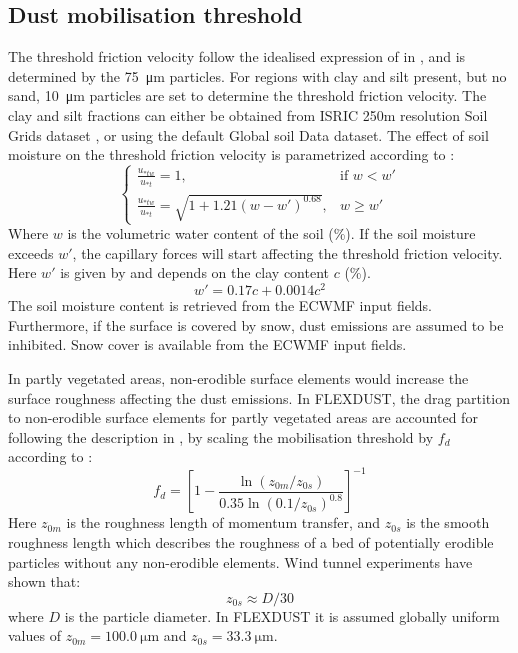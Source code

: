 \subsection{Dust mobilisation threshold}
The threshold friction velocity follow the idealised expression of \textcite{shao2000simple} in , and is determined by the \SI{75}{\micro\metre} particles. 
For regions with clay and silt present, but no sand, \SI{10}{\micro\metre} 
particles are set to determine the threshold friction velocity. The clay and 
silt fractions can either be obtained from ISRIC 250m resolution Soil Grids dataset 
\parencite{soil-grid_ref}, or using the default Global soil Data \cite{task2014global} dataset. 
The effect of soil moisture on the threshold friction velocity is parametrized according to \textcite{fecan1998parametrization}:
\begin{equation}
    \begin{cases}
    \frac{u_{*tw}}{u_{*t}}=1, & \text{if } w < w' \\
    \frac{u_{*tw}}{u_{*t}}=\sqrt{1+1.21(w-w')^{0.68}}, & w \geq w'
    \end{cases}
\end{equation}
Where $w$ is the volumetric water content of the soil (\%). If the soil moisture exceeds $w'$, the capillary 
forces will start affecting the threshold friction velocity. Here $w'$ is given by  
and depends on the clay content $c$ (\%).   
\begin{equation} \label{eq:moisture_clay}
    w' = 0.17c + 0.0014c^2
\end{equation}
The soil moisture content is retrieved from the ECWMF input fields.
Furthermore, if the surface is covered by snow, dust emissions are assumed to be inhibited. 
Snow cover is available from the ECWMF input fields. 
\par In partly vegetated areas, non-erodible surface elements would increase the surface 
roughness affecting the dust emissions. In FLEXDUST, the drag partition to non-erodible 
surface elements for partly vegetated areas are accounted for following the description in 
\textcite{zender2003mineral}, by scaling the mobilisation threshold by $f_d$ according to :
\begin{equation}\label{eq:drag_partition}
    f_d = \left[1 - \frac{\ln (z_{0m}/z_{0s})}{0.35\ln (0.1/z_{0s})^{0.8}}\right]^{-1}
\end{equation}
Here $z_{0m}$ is the roughness length of momentum transfer, and $z_{0s}$ is the smooth roughness length which 
describes the roughness of a bed of potentially erodible particles without any non-erodible elements. Wind tunnel 
experiments have shown that: 
\begin{equation}
    z_{0s} \approx D/30
\end{equation}
where $D$ is the particle diameter. In FLEXDUST it is assumed globally uniform values of  $z_{0m}=\SI{100.0}{\micro\metre}$ and $z_{0s}=\SI{33.3}{\micro\metre}$.

